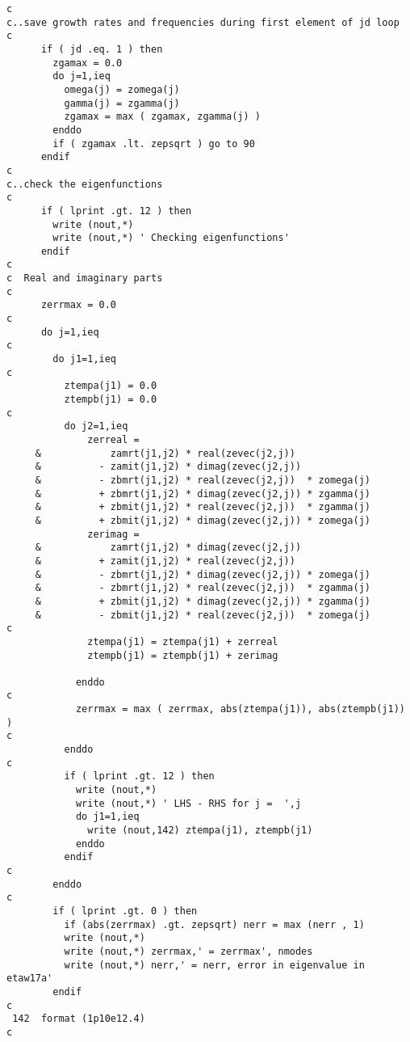 \begin{verbatim}
c
c..save growth rates and frequencies during first element of jd loop
c
      if ( jd .eq. 1 ) then
        zgamax = 0.0
        do j=1,ieq
          omega(j) = zomega(j)
          gamma(j) = zgamma(j)
          zgamax = max ( zgamax, zgamma(j) )
        enddo
        if ( zgamax .lt. zepsqrt ) go to 90
      endif
c
c..check the eigenfunctions
c
      if ( lprint .gt. 12 ) then
        write (nout,*)
        write (nout,*) ' Checking eigenfunctions'
      endif
c
c  Real and imaginary parts
c
      zerrmax = 0.0
c
      do j=1,ieq
c
        do j1=1,ieq
c
          ztempa(j1) = 0.0
          ztempb(j1) = 0.0
c
          do j2=1,ieq
              zerreal =
     &            zamrt(j1,j2) * real(zevec(j2,j))
     &          - zamit(j1,j2) * dimag(zevec(j2,j))
     &          - zbmrt(j1,j2) * real(zevec(j2,j))  * zomega(j)
     &          + zbmrt(j1,j2) * dimag(zevec(j2,j)) * zgamma(j)
     &          + zbmit(j1,j2) * real(zevec(j2,j))  * zgamma(j)
     &          + zbmit(j1,j2) * dimag(zevec(j2,j)) * zomega(j)
              zerimag =
     &            zamrt(j1,j2) * dimag(zevec(j2,j))
     &          + zamit(j1,j2) * real(zevec(j2,j))
     &          - zbmrt(j1,j2) * dimag(zevec(j2,j)) * zomega(j)
     &          - zbmrt(j1,j2) * real(zevec(j2,j))  * zgamma(j)
     &          + zbmit(j1,j2) * dimag(zevec(j2,j)) * zgamma(j)
     &          - zbmit(j1,j2) * real(zevec(j2,j))  * zomega(j)
c
              ztempa(j1) = ztempa(j1) + zerreal
              ztempb(j1) = ztempb(j1) + zerimag

            enddo
c
            zerrmax = max ( zerrmax, abs(ztempa(j1)), abs(ztempb(j1)) )
c
          enddo
c
          if ( lprint .gt. 12 ) then
            write (nout,*)
            write (nout,*) ' LHS - RHS for j =  ',j
            do j1=1,ieq
              write (nout,142) ztempa(j1), ztempb(j1)
            enddo
          endif
c
        enddo
c
        if ( lprint .gt. 0 ) then
          if (abs(zerrmax) .gt. zepsqrt) nerr = max (nerr , 1)
          write (nout,*) 
          write (nout,*) zerrmax,' = zerrmax', nmodes
          write (nout,*) nerr,' = nerr, error in eigenvalue in etaw17a'
        endif
c
 142  format (1p10e12.4)
c
\end{verbatim}

